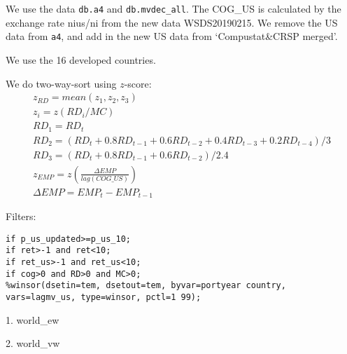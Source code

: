 % 

\usepackage[T1]{fontenc}




\thispagestyle{fancy}

\newcommand{\code}{\texttt}
\newcommand*{\Commonpath}{20190225/replaceUS-twoway-developed}


We use the data \code{db.a4} and \code{db.mvdec\_all}. The COG\_US is calculated by the exchange rate nius/ni from the new data WSDS20190215.
We remove the US data from \code{a4}, and add in the new US data from `Compustat\&CRSP merged'.

We use the 16 developed countries.



We do two-way-sort using $z$-score:
$$
\begin{aligned}
& z_{RD} = mean(z_1, z_2, z_3) \\
& z_i = z(RD_i/MC) \\
& RD_1 = RD_t \\
& RD_2 = (RD_t + 0.8RD_{t-1} + 0.6RD_{t-2} + 0.4RD_{t-3} + 0.2RD_{t-4})/3 \\
& RD_3 = (RD_t + 0.8RD_{t-1} + 0.6RD_{t-2})/2.4 
& \\
& z_{EMP} = z(\frac{\Delta EMP}{lag(COG\_US)}) \\
& \Delta EMP = EMP_t - EMP_{t-1}
\end{aligned}
$$



Filters:

\code{if p\_us\_updated>=p\_us\_10;} \\
\code{if ret>-1 and ret<10;} \\
\code{if ret\_us>-1 and ret\_us<10;} \\
\code{if cog>0 and RD>0 and MC>0;} \\
\code{\%winsor(dsetin=tem, dsetout=tem, byvar=portyear country, vars=lagmv\_us, type=winsor, pctl=1 99);}

\small


1. world\_ew


2. world\_vw





